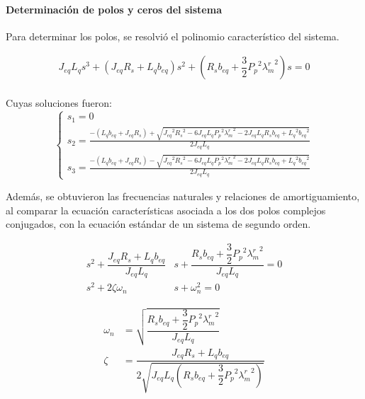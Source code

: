 \documentclass[a4paper, 10pt, onecolumn,journal]{ieeeconf}
\begin{document}
\paragraph{\textbf{Determinación de polos y ceros del sistema}}
Para determinar los polos, se resolvió el polinomio característico del sistema.

\begin{align}
	J_{eq} L_{q} s^3 +\left( J_{eq} R_{s} + L_{q} b_{eq} \right)s^2 + \left( R_{s} b_{eq} + \dfrac{3}{2} {P_{p}}^2 { \lambda^r_m}^2\right) s = 0 \label{polinomio caracteristico del sistema LTI}\\
\end{align}

Cuyas soluciones fueron:
\begin{equation}
	\begin{cases}
		s_1 = 0\\
		s_2 = \frac{-\left( L_{q} b_{eq} + J_{eq} R_{s}\right)  + \sqrt{{J_{eq}}^2 {R_{s}}^2 - 6 J_{eq} L_{q} {P_{p}}^2 {\lambda^r_m}^2 - 2 J_{eq} L_{q} R_{s} b_{eq}+{L_{q}}^2 {b_{eq}}^2} }{2 J_{eq} L_{q}}\\
		s_3 = \frac{-\left( L_{q} b_{eq} + J_{eq} R_{s}\right)  - \sqrt{{J_{eq}}^2 {R_{s}}^2 - 6 J_{eq} L_{q} {P_{p}}^2 {\lambda^r_m}^2 - 2 J_{eq} L_{q} R_{s} b_{eq}+{L_{q}}^2 {b_{eq}}^2} }{2 J_{eq} L_{q}}
	\end{cases}\label{polos del sistema LTI}
\end{equation}

Además, se obtuvieron las frecuencias naturales y relaciones de amortiguamiento, al comparar la ecuación características asociada a los dos polos complejos conjugados, con  la ecuación estándar de un sistema de segundo orden.

\begin{align}
	 s^2 +\dfrac{ J_{eq} R_{s} + L_{q} b_{eq}}{J_{eq} L_{q}} &s +\dfrac{ R_{s} b_{eq} + \dfrac{3}{2} {P_{p}}^2 { \lambda^r_m}^2}{J_{eq} L_{q}}  = 0 \label{polinomio caracteristico del sistema LTI polos complejos conjugados}\\
	 s^2 + 2 \zeta \omega_{n} &s + \omega_{n}^{2} = 0 \label{ecuación estandar de un sistema de segundo orden}
\end{align}

\begin{align}
	\omega_{n} &= \sqrt{\dfrac{ R_{s} b_{eq} + \dfrac{3}{2} {P_{p}}^2 { \lambda^r_m}^2}{J_{eq} L_{q}}} \label{eciacion de las frecuencias naturales del LTI}\\
	\zeta &= \dfrac{ J_{eq} R_{s} + L_{q} b_{eq}}{2 \sqrt{ J_{eq} L_{q}\left( R_{s} b_{eq} + \dfrac{3}{2} {P_{p}}^2 { \lambda^r_m}^2\right) }} \label{eciacion de las relaciones de amortiguamiento del LTI}
\end{align}
\end{document}
